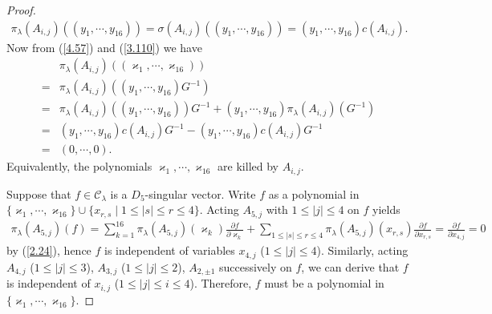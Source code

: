 \documentclass[12pt]{article}
\numberwithin{equation}{section}
\theoremstyle{definition}
\theoremstyle{remark}
\begin{document}
\begin{proof}
\begin{eqnarray}
		\pi_{\lambda}(A_{i,j})((y_1,\cdots,y_{16}))=\sigma(A_{i,j})((y_1,\cdots,y_{16}))=(y_1,\cdots,y_{16})c(A_{i,j}).\label{3.110}
	\end{eqnarray}
	Now from (\ref{4.57}) and (\ref{3.110}) we have
	\begin{align}
		&\pi_{\lambda}(A_{i,j})((\varkappa_1,\cdots,\varkappa_{16}))\nonumber\\
		=&\pi_{\lambda}(A_{i,j})((y_1,\cdots,y_{16})G^{-1})\nonumber\\
		=&\pi_{\lambda}(A_{i,j})((y_1,\cdots,y_{16}))G^{-1}+(y_1,\cdots,y_{16})\pi_{\lambda}(A_{i,j})(G^{-1})\nonumber\\
		=&(y_1,\cdots,y_{16})c(A_{i,j})G^{-1}-(y_1,\cdots,y_{16})c(A_{i,j})G^{-1}\nonumber\\
		=&(0,\cdots,0).
	\end{align}
	Equivalently, the polynomials $\varkappa_1,\cdots,\varkappa_{16}$ are killed by $A_{i,j}$.
	
	Suppose that $f\in\mathscr{C}_\lambda$ is a $D_5$-singular vector. Write $f$ as a polynomial in $\{\varkappa_1,\cdots,\varkappa_{16}\}\cup\{x_{r,s}\mid 1\leqslant|s|\leqslant r\leqslant 4\}$. Acting $A_{5,j}$ with $1\leqslant |j|\leqslant 4$ on $f$ yields
	\begin{eqnarray}
		\pi_{\lambda}(A_{5,j})(f)=\sum_{k=1}^{16}\pi_{\lambda}(A_{5,j})(\varkappa_k)\frac{\partial f}{\partial\varkappa_k}+\sum_{1\leqslant|s|\leqslant r\leqslant 4}\pi_{\lambda}(A_{5,j})(x_{r,s})\frac{\partial f}{\partial x_{r,s}}=\frac{\partial f}{\partial x_{4,j}}=0
	\end{eqnarray}
	by (\ref{2.24}), hence $f$ is independent of variables $x_{4,j}$ ($1\leqslant |j|\leqslant 4$). Similarly, acting $A_{4,j}$ ($1\leqslant |j|\leqslant 3$), $A_{3,j}$ ($1\leqslant |j|\leqslant 2$), $A_{2,\pm1}$ successively on $f$, we can derive that $f$ is independent of $x_{i,j}$ ($1\leqslant |j|\leqslant i\leqslant 4$). Therefore, $f$ must be a polynomial in $\{\varkappa_1,\cdots,\varkappa_{16}\}$.
	

\end{proof}
\end{document}

